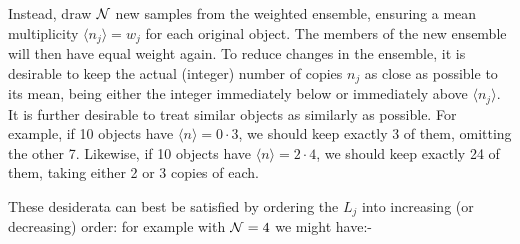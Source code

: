 Instead, draw $\cal N$ new samples from the weighted ensemble, ensuring a mean multiplicity $\langle n_j \rangle = w_j$ for each original object.  
The members of the new ensemble will then have equal weight again.
To reduce changes in the ensemble, it is desirable to keep the actual (integer) number of copies $n_j$ as close as possible to its mean, 
being either the integer immediately below or immediately above $\langle n_j \rangle$.
It is further desirable to treat similar objects as similarly as possible.
For example, if 10 objects have $\langle n \rangle = 0{\cdot}3$, we should keep exactly 3 of them, omitting the other 7.  
Likewise, if 10 objects have $\langle n \rangle = 2{\cdot}4$, we should keep exactly 24 of them, taking either 2 or 3 copies of each.  

These desiderata can best be satisfied by ordering the $L_j$ into increasing (or decreasing) order: for example with ${\cal N} = 4$ we might have:-
\smallskip
\centerline{\vbox{\offinterlineskip
      }
}
